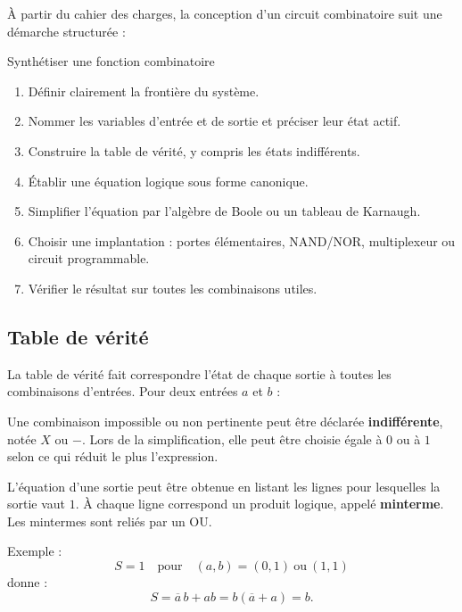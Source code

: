 À partir du cahier des charges, la conception d'un circuit combinatoire suit une démarche structurée :
\begin{center}\TLDemarcheCombinatoire\end{center}

\begin{TLLogicMethod}{Synthétiser une fonction combinatoire}
\begin{enumerate}
  \item Définir clairement la frontière du système.
  \item Nommer les variables d'entrée et de sortie et préciser leur état actif.
  \item Construire la table de vérité, y compris les états indifférents.
  \item Établir une équation logique sous forme canonique.
  \item Simplifier l'équation par l'algèbre de Boole ou un tableau de Karnaugh.
  \item Choisir une implantation : portes élémentaires, NAND/NOR, multiplexeur ou circuit programmable.
  \item Vérifier le résultat sur toutes les combinaisons utiles.
\end{enumerate}
\end{TLLogicMethod}

\subsection{Table de vérité}

La table de vérité fait correspondre l'état de chaque sortie à toutes les combinaisons d'entrées. Pour deux entrées $a$ et $b$ :
\begin{center}\TLTableVeriteDeuxEntrees\end{center}

Une combinaison impossible ou non pertinente peut être déclarée \textbf{indifférente}, notée $X$ ou $-$. Lors de la simplification, elle peut être choisie égale à $0$ ou à $1$ selon ce qui réduit le plus l'expression.

L'équation d'une sortie peut être obtenue en listant les lignes pour lesquelles la sortie vaut $1$. À chaque ligne correspond un produit logique, appelé \textbf{minterme}. Les mintermes sont reliés par un OU.

Exemple :
\[
S=1\quad\text{pour}\quad(a,b)=(0,1)\ \text{ou}\ (1,1)
\]
donne :
\[
S=\overline a\,b+ab=b(\overline a+a)=\boxed b.
\]


